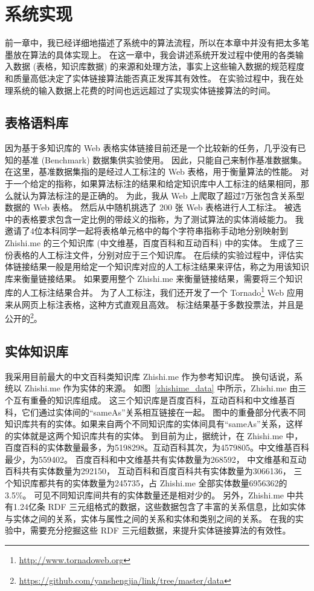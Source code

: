 \chapter{系统实现}
前一章中，我已经详细地描述了系统中的算法流程，所以在本章中并没有把太多笔墨放在算法的具体实现上。
在这一章中，我会讲述系统开发过程中使用的各类输入数据 (表格，知识库数据) 的来源和处理方法，事实上这些输入数据的规范程度和质量高低决定了实体链接算法能否真正发挥其有效性。
在实验过程中，我在处理系统的输入数据上花费的时间也远远超过了实现实体链接算法的时间。


\section{表格语料库}
因为基于多知识库的 Web 表格实体链接目前还是一个比较新的任务，几乎没有已知的基准 (Benchmark) 数据集供实验使用。
因此，只能自己来制作基准数据集。
在这里，基准数据集指的是经过人工标注的 Web 表格，用于衡量算法的性能。
对于一个给定的指称，如果算法标注的结果和给定知识库中人工标注的结果相同，那么就认为算法标注的是正确的。
为此，我从 Web 上爬取了超过7万张包含关系型数据的 Web 表格。
然后从中随机挑选了 200 张 Web 表格进行人工标注。
被选中的表格要求包含一定比例的带歧义的指称，为了测试算法的实体消岐能力。
我邀请了4位本科同学一起将表格单元格中的每个字符串指称手动地分别映射到 Zhishi.me 的三个知识库 (中文维基，百度百科和互动百科) 中的实体。
生成了三份表格的人工标注文件，分别对应于三个知识库。
在后续的实验过程中，评估实体链接结果一般是用给定一个知识库对应的人工标注结果来评估，称之为用该知识库来衡量链接结果。
如果要用整个 Zhishi.me 来衡量链接结果，需要将三个知识库的人工标注结果合并。
为了人工标注，我们还开发了一个 Tornado\footnote{\url{http://www.tornadoweb.org}} Web 应用来从网页上标注表格，这种方式直观且高效。
标注结果基于多数投票法，并且是公开的\footnote{\url{https://github.com/yanshengjia/link/tree/master/data}}。


\section{实体知识库}
我采用目前最大的中文百科类知识库 Zhishi.me 作为参考知识库。
换句话说，系统以 Zhishi.me 作为实体的来源。
如图~\ref{zhishime_data} 中所示，Zhishi.me 由三个互有重叠的知识库组成。
这三个知识库是百度百科，互动百科和中文维基百科，它们通过实体间的``sameAs''关系相互链接在一起。
图中的重叠部分代表不同知识库共有的实体。如果来自两个不同知识库的实体间具有``sameAs''关系，这样的实体就是这两个知识库共有的实体。
到目前为止，据统计，在 Zhishi.me 中，百度百科的实体数量最多，为5198298。互动百科其次，为4579805。中文维基百科最少，为559402。
百度百科和中文维基共有实体数量为268592，
中文维基和互动百科共有实体数量为292150，
互动百科和百度百科共有实体数量为3066136，
三个知识库都共有的实体数量为245735，占 Zhishi.me 全部实体数量6956362的3.5\%。
可见不同知识库间共有的实体数量还是相对少的。
另外，Zhishi.me 中共有1.24亿条 RDF 三元组格式的数据，这些数据包含了丰富的关系信息，比如实体与实体之间的关系，实体与属性之间的关系和实体和类别之间的关系。
在我的实验中，需要充分挖掘这些 RDF 三元组数据，来提升实体链接算法的有效性。

